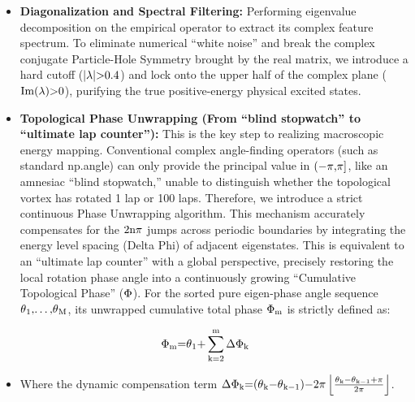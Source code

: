 \documentclass[fleqn,10pt]{wlscirep}
\begin{document}
\begin{itemize}
\item
  \textbf{Diagonalization and Spectral Filtering:} Performing eigenvalue
  decomposition on the empirical operator to extract its complex feature
  spectrum. To eliminate numerical ``white noise'' and break the complex
  conjugate Particle-Hole Symmetry brought by the real matrix, we
  introduce a hard cutoff (\(\text{|}\text{\ensuremath{\lambda}}\text{|>0.4}\)) and lock
  onto the upper half of the complex plane
  (\(\text{Im(}\text{\ensuremath{\lambda}}\text{)>0}\)), purifying the true positive-energy
  physical excited states.
\item
  \textbf{Topological Phase Unwrapping (From ``blind stopwatch'' to
  ``ultimate lap counter''):} This is the key step to realizing
  macroscopic energy mapping. Conventional complex angle-finding
  operators (such as standard np.angle) can only provide the principal
  value in \(\text{(\ensuremath{-}}\text{\ensuremath{\pi}}\text{,}\text{\ensuremath{\pi}}\text{]}\), like an
  amnesiac ``blind stopwatch,'' unable to distinguish whether the
  topological vortex has rotated 1 lap or 100 laps. Therefore, we
  introduce a strict continuous Phase Unwrapping algorithm. This
  mechanism accurately compensates for the \(\text{2}\text{n\ensuremath{\pi}}\) jumps
  across periodic boundaries by integrating the energy level spacing
  (Delta Phi) of adjacent eigenstates. This is equivalent to an
  ``ultimate lap counter'' with a global perspective, precisely
  restoring the local rotation phase angle into a continuously growing
  ``Cumulative Topological Phase'' (\(\text{\ensuremath{\Phi}}\)). For the sorted pure
  eigen-phase angle sequence
  \(\text{\ensuremath{\theta}}_{\text{1}}\text{,\ldots{},}\text{\ensuremath{\theta}}_{\text{M}}\), its unwrapped
  cumulative total phase \(\text{\ensuremath{\Phi}}_{\text{m}}\) is strictly defined as:
\end{itemize}

\[\text{\ensuremath{\Phi}}_{\text{m}}\text{=}\text{\ensuremath{\theta}}_{\text{1}}\text{+}\sum_{\text{k}\text{=2}}^{\text{m}}\text{\ensuremath{\Delta}}\text{\ensuremath{\Phi}}_{\text{k}}\]

\begin{itemize}
\item
  Where the dynamic compensation term
  \(\text{\ensuremath{\Delta}}\text{\ensuremath{\Phi}}_{\text{k}}\text{=(}\text{\ensuremath{\theta}}_{\text{k}}\text{\ensuremath{-}}\text{\ensuremath{\theta}}_{\text{k}\text{\ensuremath{-}1}}\text{)\ensuremath{-}2}\text{\ensuremath{\pi}}\left\lfloor \frac{\text{\ensuremath{\theta}}_{\text{k}}\text{\ensuremath{-}}\text{\ensuremath{\theta}}_{\text{k}\text{\ensuremath{-}1}}\text{+}\text{\ensuremath{\pi}}}{\text{2}\text{\ensuremath{\pi}}} \right\rfloor\).
\end{itemize}
\end{document}
